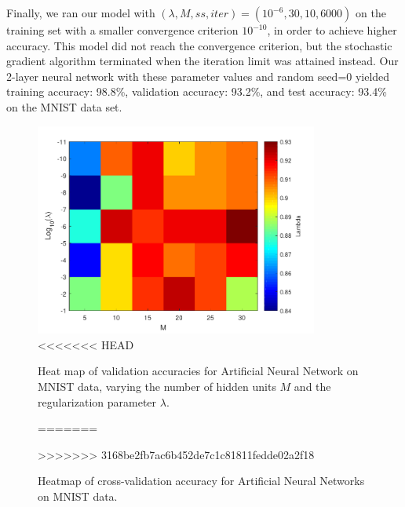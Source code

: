 Finally, we ran our model with $(\lambda, M, ss, iter) = (10^{-6}, 30, 10, 6000)$ on the training set with a smaller convergence criterion $10^{-10}$, in order to achieve higher accuracy. This model did not reach the convergence criterion, but the stochastic gradient algorithm terminated when the iteration limit was attained instead.  Our 2-layer neural network with these parameter values and random seed=0 yielded training accuracy: 98.8\%, validation accuracy: 93.2\%, and test accuracy: 93.4\% on the MNIST data set.  

\begin{figure}
\centering
	\includegraphics[height=70mm]{mnist_cv.pdf}
<<<<<<< HEAD
    \caption{Heat map of validation accuracies for Artificial Neural Network on MNIST data, varying the number of hidden units $M$ and the regularization parameter $\lambda$.}  \label{fig:mnist_cv}  
=======
    \caption{Heatmap of cross-validation accuracy for Artificial Neural Networks on MNIST data.}  \label{fig:mnist_cv}  
>>>>>>> 3168be2fb7ac6b452de7c1c81811fedde02a2f18
\end{figure}
